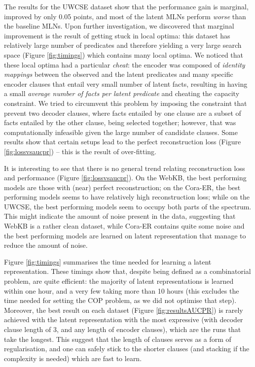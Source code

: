 The results for the UWCSE dataset show that the performance gain is marginal, improved by only 0.05 points, and most of the latent MLNs perform \textit{worse} than the baseline MLNs.
Upon further investigation, we discovered that marginal improvement is the result of  getting stuck in local optima: this dataset has relatively large number of predicates  and therefore yielding a very large search space (Figure \ref{fig:timings}) which contains many local optima.
We noticed that these local optima had a particular \textit{cheat}: the encoder was composed of \textit{identity mappings} between the observed and the latent predicates and many specific encoder clauses that entail very small number of latent facts, resulting in having a small \textit{average number of facts per latent predicate} and cheating the capacity constraint.
We tried to circumvent this problem by imposing the constraint that prevent two decoder clauses, where facts entailed by one clause are a subset of facts entailed by the other clause, being selected together; however, that was computationally infeasible given the large number of candidate clauses.
Some results show that certain setups lead to the perfect reconstruction loss (Figure \ref{fig:lossvsaucpr}) -- this is the result of over-fitting. 






It is interesting to see that there is no general trend relating reconstruction loss and performance (Figure \ref{fig:lossvsaucpr}).
On the WebKB, the best performing models are those with (near) perfect reconstruction; on the Cora-ER, the best performing models seems to have relatively high reconstruction loss; while on the UWCSE, the best performing models seem to occupy both parts of the spectrum. 
This might indicate the amount of noise present in the data, suggesting that WebKB is a rather clean dataset, while Cora-ER contains quite some noise and the best performing models are learned on latent representation that manage to reduce the amount of noise.


Figure \ref{fig:timings} summarises the time needed for learning a  latent representation.
These timings show that, despite being defined as a combinatorial problem,  are quite efficient: the majority of latent representations is learned within one hour, and a very few taking more than 10 hours (this excludes the time needed for setting the COP problem, as we did not optimise that step). 
Moreover, the best result on each dataset (Figure \ref{fig:resultsAUCPR}) is rarely achieved with the latent representation with the most expressive \alp{} (with decoder clause length of 3, and any length of encoder clauses), which are the runs that take the longest.
This suggest that the length of clauses serves as a form of regularisation, and one can safely stick to the shorter clauses (and stacking if the complexity is needed) which are fast to learn. 



